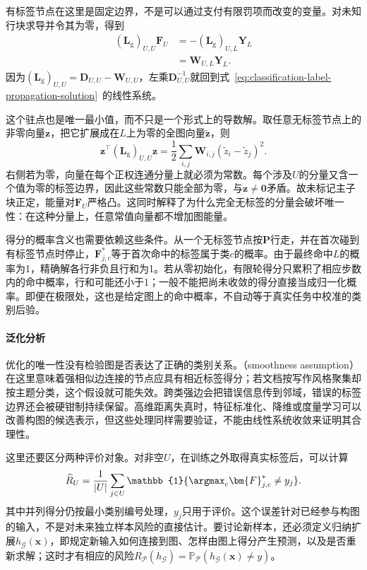 有标签节点在这里是固定边界，不是可以通过支付有限罚项而改变的变量。对未知行块求导并令其为零，得到
\begin{equation}
  \label{eq:classification-label-propagation-dirichlet}
  \begin{aligned}
    (\bm{L}_{\mathrm{g}})_{U,U}\bm{F}_U
      &=-(\bm{L}_{\mathrm{g}})_{U,L}\bm{Y}_L\\
      &=\bm{W}_{U,L}\bm{Y}_L.
  \end{aligned}
\end{equation}
因为$(\bm{L}_{\mathrm{g}})_{U,U}=\bm{D}_{U,U}-\bm{W}_{U,U}$，左乘$\bm{D}_{U,U}^{-1}$就回到式~\eqref{eq:classification-label-propagation-solution}~的线性系统。

这个驻点也是唯一最小值，而不只是一个形式上的导数解。取任意无标签节点上的非零向量$\bm{z}$，把它扩展成在$L$上为零的全图向量$\widetilde{\bm{z}}$，则
\[
  \bm{z}^{\top}(\bm{L}_{\mathrm{g}})_{U,U}\bm{z}
    =\frac12\sum_{i,j}\bm{W}_{i,j}
      (\widetilde z_i-\widetilde z_j)^2.
\]
右侧若为零，向量在每个正权连通分量上就必须为常数。每个涉及$U$的分量又含一个值为零的标签边界，因此这些常数只能全部为零，与$\bm{z}\ne\bm{0}$矛盾。故未标记主子块正定，能量对$\bm{F}_U$严格凸。这同时解释了为什么完全无标签的分量会破坏唯一性：在这种分量上，任意常值向量都不增加图能量。

得分的概率含义也需要依赖这些条件。从一个无标签节点按$\bm{P}$行走，并在首次碰到有标签节点时停止，$\bm{F}_{j,c}^\ast$等于首次命中的标签属于类$c$的概率。由于最终命中$L$的概率为1，精确解各行非负且行和为1。若从零初始化，有限轮得分只累积了相应步数内的命中概率，行和可能还小于1；一般不能把尚未收敛的得分直接当成归一化概率。即便在极限处，这也是给定图上的命中概率，不自动等于真实任务中校准的类别后验。

\paragraph{泛化分析}
优化的唯一性没有检验图是否表达了正确的类别关系。（smoothness assumption）在这里意味着强相似边连接的节点应具有相近标签得分；若文档按写作风格聚集却按主题分类，这个假设就可能失效。跨类强边会把错误信息传到邻域，错误的标签边界还会被硬钳制持续保留。高维距离失真时，特征标准化、降维或度量学习可以改善构图的候选表示，但这些处理同样需要验证，不能由线性系统收敛来证明其合理性。

这里还要区分两种评价对象。对非空$U$，在训练之外取得真实标签后，可以计算
\begin{equation}
  \label{eq:classification-label-propagation-pool-risk}
  \widehat R_U
    =\frac{1}{|U|}\sum_{j\in U}
      \mathbb{1}\{\argmax_c\bm{F}_{j,c}^\ast\ne y_j\}.
\end{equation}
其中并列得分仍按最小类别编号处理，$y_j$只用于评价。这个误差针对已经参与构图的输入，不是对未来独立样本风险的直接估计。要讨论新样本，还必须定义归纳扩展$h_{\mathcal{G}}(\bm{x})$，即规定新输入如何连接到图、怎样由图上得分产生预测，以及是否重新求解；这时才有相应的风险$R_{\mathcal{P}}(h_{\mathcal{G}})=\mathbb{P}_{\mathcal{P}}(h_{\mathcal{G}}(\bm{x})\ne y)$。

